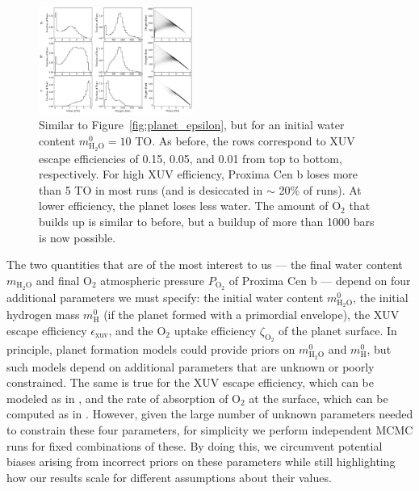 \documentclass[]{emulateapj}
\begin{document}
\begin{figure}[hbt]
  \begin{center}
      \includegraphics[width=0.45\textwidth]{figures/planet_epsilon10.pdf}
       \caption{Similar to Figure~\ref{fig:planet_epsilon}, but for an initial water content
       $m_\mathrm{H_2O}^0 = 10$ TO. As before, the rows correspond to XUV escape efficiencies of
       0.15, 0.05, and 0.01 from top to bottom, respectively. For high XUV efficiency, Proxima
       Cen b loses more than 5 TO in most runs (and is desiccated in $\sim$ 20\% of runs). At lower
       efficiency, the planet loses less water. The amount of O$_2$ that builds up is similar
       to before, but a buildup of more than 1000 bars is now possible.}
     \label{fig:planet_epsilon10}
  \end{center}
\end{figure}

The two quantities that are of the most interest to us --- the final water content $m_\mathrm{H_2O}$ and final O$_2$ atmospheric 
pressure $P_\mathrm{O_2}$ of Proxima Cen b --- depend on four additional parameters we must specify: the initial water content $m_\mathrm{H_2O}^0$, the initial hydrogen 
mass $m_\mathrm{H}^0$ (if the planet formed with a primordial envelope), the XUV escape efficiency $\epsilon_\mathrm{xuv}$, and
the O$_2$ uptake efficiency $\zeta_\mathrm{O_2}$ of the planet surface. In principle, planet formation models could provide
priors on $m_\mathrm{H_2O}^0$ and $m_\mathrm{H}^0$, but such models depend on additional parameters that are unknown or poorly 
constrained. The same is true for the XUV escape efficiency, which can be modeled as in \cite{Ribas16}, and the rate of
absorption of O$_2$ at the surface, which can be computed as in \cite{Schaefer2016}. However, given the large number of unknown
parameters needed to constrain these four parameters, for simplicity we perform independent MCMC runs for fixed combinations
of these. By doing this, we circumvent potential biases arising from incorrect priors on these parameters while still
highlighting how our results scale for different assumptions about their values.
\end{document}
